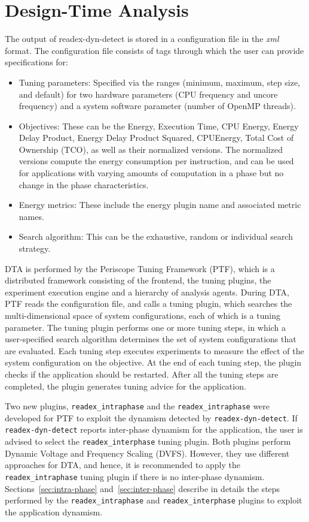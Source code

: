 \section{Design-Time Analysis} \label{sec:dta}
The output of readex-dyn-detect is stored in a configuration file in the \textit{xml} format. The configuration file consists of tags through which the user can provide specifications for:
\begin{itemize}
	\item Tuning parameters: Specified via the ranges (minimum, maximum, step size, and default) for two hardware parameters (CPU frequency and uncore frequency) and a system software parameter (number of OpenMP threads).
	\item Objectives: These can be the Energy, Execution Time, CPU Energy, Energy Delay Product, Energy Delay Product Squared, CPUEnergy, Total Cost of Ownership (TCO), as well as their normalized versions. The normalized versions compute the energy consumption per instruction, and can be used for applications with varying amounts of computation in a phase but no change in the phase characteristics.
	\item Energy metrics: These include the energy plugin name and associated metric names. 
	\item Search algorithm: This can be the exhaustive, random or individual search strategy. 
\end{itemize} 

DTA is performed by the Periscope Tuning Framework (PTF), which is a distributed framework consisting of the frontend, the tuning plugins, the experiment execution engine and a hierarchy of analysis agents. During DTA, PTF reads the configuration file, and calls a tuning plugin, which  searches the multi-dimensional space of system configurations, each of which is a tuning parameter. The tuning plugin performs one or more tuning steps, in which a user-specified search algorithm determines the set of system configurations that are evaluated. Each tuning step executes experiments to measure the effect of the system configuration on the objective. At the end of each tuning step, the plugin checks if the application should be restarted. After all the tuning steps are completed, the plugin generates tuning advice for the application.

Two new plugins, \texttt{readex\_intraphase} and the \texttt{readex\_intraphase} were developed for PTF to exploit the dynamism detected by \texttt{readex-dyn-detect}. If \texttt{readex-dyn-detect} reports inter-phase dynamism for the application, the user is advised to select the \texttt{readex\_interphase} tuning plugin. Both plugins perform Dynamic Voltage and Frequency Scaling (DVFS). However, they use different approaches for DTA, and hence, it is recommended to apply the \texttt{readex\_intraphase} tuning plugin if there is no inter-phase dynamism. Sections~\ref{sec:intra-phase} and~\ref{sec:inter-phase} describe in details the steps performed by the \texttt{readex\_intraphase} and \texttt{readex\_interphase} plugins to exploit the application dynamism.


